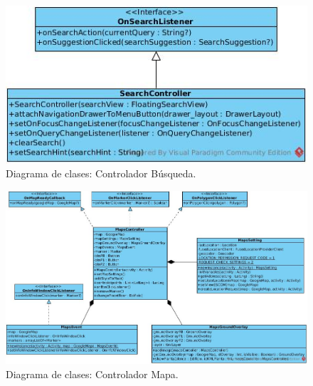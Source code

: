 \begin{figure}[!htpb]
	\hypertarget{fig:clasesContBusqueda}{\hspace{1pt}}
	\begin{center}
		\includegraphics[width=1\textwidth]{images/clases/ControladorBusqueda}
		\caption{Diagrama de clases: Controlador Búsqueda.}
		\label{fig:clasesContBusqueda}
	\end{center}
\end{figure}

\begin{figure}[!htpb]
	\hypertarget{fig:clasesContMap}{\hspace{1pt}}
	\begin{center}
		\includegraphics[width=1\textwidth]{images/clases/ControladorMapa}
		\caption{Diagrama de clases: Controlador Mapa.}
		\label{fig:clasesContMap}
	\end{center}
\end{figure}

